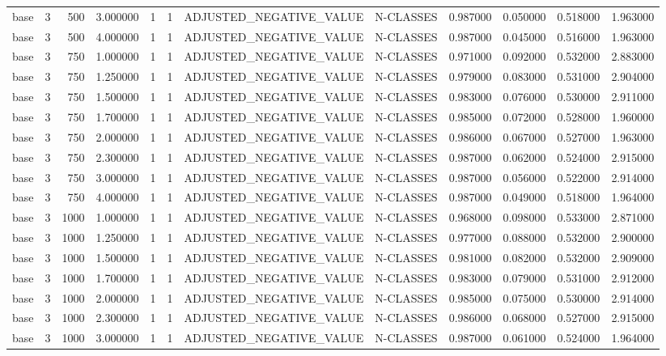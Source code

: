 \begin{tabular}{lrrrllllrrrr}
base & 3 & 500 & 3.000000 & 1 & 1 & ADJUSTED_NEGATIVE_VALUE & N-CLASSES & 0.987000 & 0.050000 & 0.518000 & 1.963000 \\
base & 3 & 500 & 4.000000 & 1 & 1 & ADJUSTED_NEGATIVE_VALUE & N-CLASSES & 0.987000 & 0.045000 & 0.516000 & 1.963000 \\
base & 3 & 750 & 1.000000 & 1 & 1 & ADJUSTED_NEGATIVE_VALUE & N-CLASSES & 0.971000 & 0.092000 & 0.532000 & 2.883000 \\
base & 3 & 750 & 1.250000 & 1 & 1 & ADJUSTED_NEGATIVE_VALUE & N-CLASSES & 0.979000 & 0.083000 & 0.531000 & 2.904000 \\
base & 3 & 750 & 1.500000 & 1 & 1 & ADJUSTED_NEGATIVE_VALUE & N-CLASSES & 0.983000 & 0.076000 & 0.530000 & 2.911000 \\
base & 3 & 750 & 1.700000 & 1 & 1 & ADJUSTED_NEGATIVE_VALUE & N-CLASSES & 0.985000 & 0.072000 & 0.528000 & 1.960000 \\
base & 3 & 750 & 2.000000 & 1 & 1 & ADJUSTED_NEGATIVE_VALUE & N-CLASSES & 0.986000 & 0.067000 & 0.527000 & 1.963000 \\
base & 3 & 750 & 2.300000 & 1 & 1 & ADJUSTED_NEGATIVE_VALUE & N-CLASSES & 0.987000 & 0.062000 & 0.524000 & 2.915000 \\
base & 3 & 750 & 3.000000 & 1 & 1 & ADJUSTED_NEGATIVE_VALUE & N-CLASSES & 0.987000 & 0.056000 & 0.522000 & 2.914000 \\
base & 3 & 750 & 4.000000 & 1 & 1 & ADJUSTED_NEGATIVE_VALUE & N-CLASSES & 0.987000 & 0.049000 & 0.518000 & 1.964000 \\
base & 3 & 1000 & 1.000000 & 1 & 1 & ADJUSTED_NEGATIVE_VALUE & N-CLASSES & 0.968000 & 0.098000 & 0.533000 & 2.871000 \\
base & 3 & 1000 & 1.250000 & 1 & 1 & ADJUSTED_NEGATIVE_VALUE & N-CLASSES & 0.977000 & 0.088000 & 0.532000 & 2.900000 \\
base & 3 & 1000 & 1.500000 & 1 & 1 & ADJUSTED_NEGATIVE_VALUE & N-CLASSES & 0.981000 & 0.082000 & 0.532000 & 2.909000 \\
base & 3 & 1000 & 1.700000 & 1 & 1 & ADJUSTED_NEGATIVE_VALUE & N-CLASSES & 0.983000 & 0.079000 & 0.531000 & 2.912000 \\
base & 3 & 1000 & 2.000000 & 1 & 1 & ADJUSTED_NEGATIVE_VALUE & N-CLASSES & 0.985000 & 0.075000 & 0.530000 & 2.914000 \\
base & 3 & 1000 & 2.300000 & 1 & 1 & ADJUSTED_NEGATIVE_VALUE & N-CLASSES & 0.986000 & 0.068000 & 0.527000 & 2.915000 \\
base & 3 & 1000 & 3.000000 & 1 & 1 & ADJUSTED_NEGATIVE_VALUE & N-CLASSES & 0.987000 & 0.061000 & 0.524000 & 1.964000 \\

\end{tabular}
